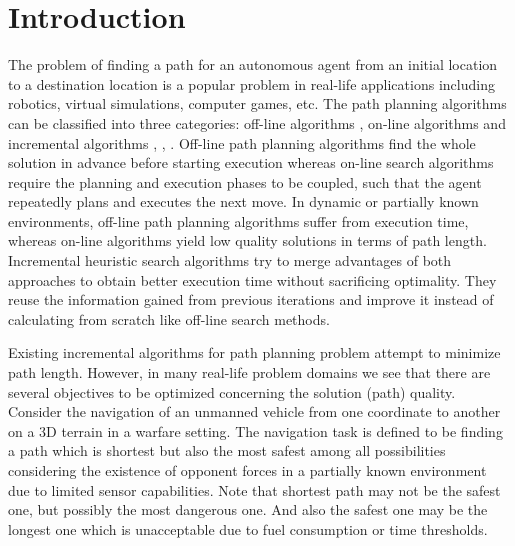 \documentclass[10pt, a4paper, conference, compsocconf]{IEEEtran}
\begin{document}
\section{Introduction}
The problem of finding a path for an autonomous agent from an initial location to a destination location is a popular problem in real-life applications including robotics, virtual simulations, computer games, etc. The path planning algorithms can be classified into three categories: off-line algorithms \cite{Dijkstra:1959} \cite{AStarHart:1968}, on-line algorithms \cite{RTAStarKorf:1990} and incremental algorithms \cite{DStar:1994}, \cite{Koenig:2002}, \cite{FocussedDStarStentz:1995}. Off-line path planning algorithms find the whole solution in advance before starting execution whereas on-line search algorithms require the planning and execution phases to be coupled, such that the agent repeatedly plans and executes the next move. In dynamic or partially known environments, off-line path planning algorithms suffer from execution time, whereas on-line algorithms yield low quality solutions in terms of path length. Incremental heuristic search algorithms try to merge advantages of both approaches to obtain better execution time without sacrificing optimality. They reuse the information gained from previous iterations and improve it instead of calculating from scratch like off-line search methods. 

Existing incremental algorithms for path planning problem attempt to minimize path length. However, in many real-life problem domains we see that there are several objectives to be optimized concerning the solution (path) quality. Consider the navigation of an unmanned vehicle from one coordinate to another on a 3D terrain in a warfare setting. The navigation task is defined to be finding a path which is shortest but also the most safest among all possibilities considering the existence of opponent forces in a partially known environment due to limited sensor capabilities. Note that shortest path may not be the safest one, but possibly the most dangerous one. And also the safest one may be the longest one which is unacceptable due to fuel consumption or time thresholds. 
\end{document}
